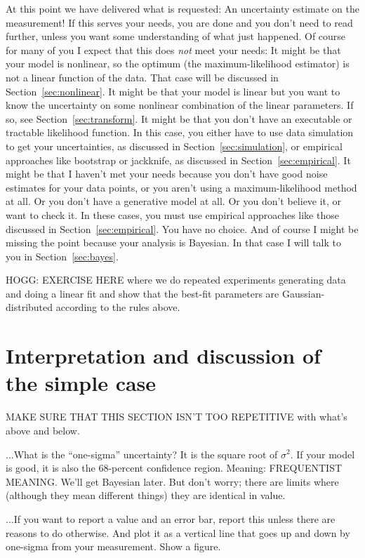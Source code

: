 \documentclass[10pt]{article}
\newcommand{\sectionname}{Section}
\begin{document}
At this point we have delivered what is requested: An uncertainty estimate
on the measurement!
If this serves your needs, you are done and you don't need to read further,
unless you want some understanding of what just happened.
Of course for many of you I expect that this does \emph{not} meet your needs:
It might be that your model is nonlinear, so the optimum (the maximum-likelihood
estimator) is not a linear function of the data. That case will be discussed
in \sectionname~\ref{sec:nonlinear}.
It might be that your model is linear but you want to know the uncertainty on
some nonlinear combination of the linear parameters.
If so, see \sectionname~\ref{sec:transform}.
It might be that you don't have an executable or tractable likelihood function.
In this case, you either have to use data simulation to get your uncertainties,
as discussed in \sectionname~\ref{sec:simulation}, or empirical approaches
like bootstrap or jackknife, as discussed in \sectionname~\ref{sec:empirical}.
It might be that I haven't met your needs because you don't have good noise
estimates for your data points, or you aren't using a maximum-likelihood method
at all. Or you don't have a generative model at all. Or you don't believe it, or
want to check it. In these cases, you must use empirical approaches like those discussed
in \sectionname~\ref{sec:empirical}. You have no choice.
And of course I might be missing the point because your analysis is Bayesian.
In that case I will talk to you in \sectionname~\ref{sec:bayes}.

HOGG: EXERCISE HERE where we do repeated experiments generating data
and doing a linear fit and show that the best-fit parameters are
Gaussian-distributed according to the rules above.

\section{Interpretation and discussion of the simple case}\label{sec:interp}

MAKE SURE THAT THIS SECTION ISN'T TOO REPETITIVE with what's above and below.

...What is the ``one-sigma'' uncertainty? It is the square root of $\sigma^2$.
If your model is good, it is also the 68-percent confidence region.
Meaning: FREQUENTIST MEANING. We'll get Bayesian later. But don't worry; there
are limits where (although they mean different things) they are identical in
value.

...If you want to report a value and an error bar, report this unless there
are reasons to do otherwise. And plot it as a vertical line that goes up and
down by one-sigma from your measurement. Show a figure.
\end{document}
